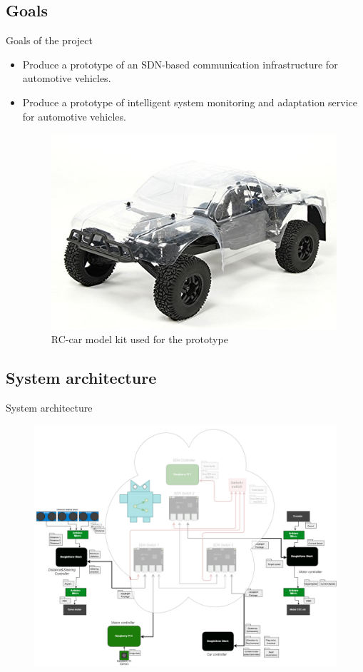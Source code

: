 \documentclass{beamer}
\begin{document}
\subsection{Goals}
\begin{frame}{Goals of the project}
    \begin{itemize}
        \item Produce a prototype of an SDN-based communication infrastructure for automotive vehicles.
        \item Produce a prototype of intelligent system monitoring and adaptation service for automotive vehicles.
        \begin{figure}
            \includegraphics[width=0.5\linewidth]{turnigy_car.jpg}
            \caption{RC-car model kit used for the prototype}
        \end{figure}
    \end{itemize}
\end{frame}


\subsection{System architecture}
\begin{frame}{System architecture}
    \begin{figure}
        \includegraphics[width=0.83\linewidth]{network.png}
    \end{figure}
\end{frame}
\end{document}
